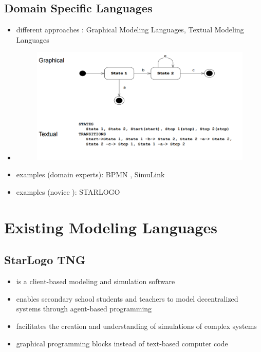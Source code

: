 \documentclass[runningheads,a4paper]{llncs}
\begin{document}
 \subsection{Domain Specific Languages}
 \begin{itemize}
 \item different approaches :  Graphical Modeling Languages, Textual Modeling Languages
 \item 
   \begin{figure}[ht]
      \centering
      \includegraphics[width=\textwidth]{images/GraficalTextualComparison.PNG}
    \end{figure}
 
 \item examples (domain experts): BPMN , SimuLink
 \item examples (novice ): STARLOGO 
 \end{itemize}
 
 \section{Existing Modeling Languages}
 
 \subsection{StarLogo TNG}

  \begin{itemize}
  \item is a client-based modeling and simulation software
  \item enables secondary school students and teachers to model decentralized systems through agent-based programming
  \item facilitates the creation and understanding of simulations of complex systems
  \item graphical programming blocks instead of text-based computer code
  \end{itemize}
  
\end{document}
